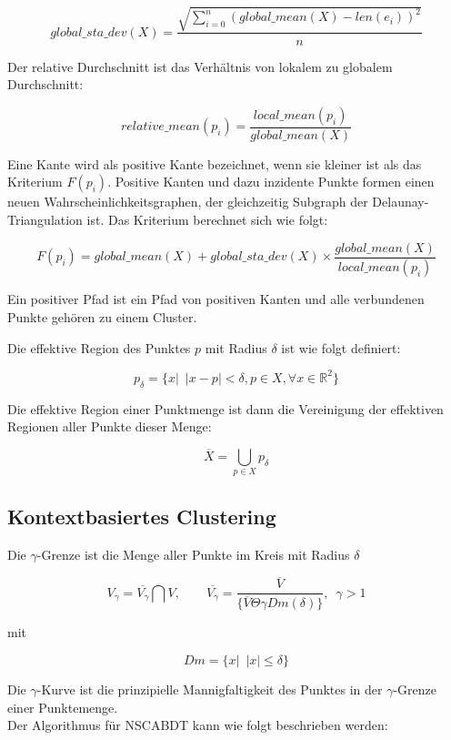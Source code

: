\documentclass[11pt,ceqn]{book}
\begin{document}
$$global\_sta\_dev(X)= \frac{\sqrt{\sum\limits_{i=0}^n \left(global\_mean(X)-len(e_i)\right)^2}}{n}$$

Der relative Durchschnitt ist das Verhältnis von lokalem zu globalem Durchschnitt:

$$relative\_mean(p_i) = \frac{local\_mean(p_i)}{global\_mean(X)}$$

Eine Kante wird als positive Kante bezeichnet, wenn sie kleiner ist als das Kriterium $F(p_i)$. Positive Kanten und dazu inzidente Punkte formen einen neuen Wahrscheinlichkeitsgraphen, der gleichzeitig Subgraph der Delaunay-Triangulation ist. Das Kriterium berechnet sich wie folgt:

$$F(p_i) = global\_mean(X) + global\_sta\_dev(X) \times \frac{global\_mean(X)}{local\_mean(p_i)}$$

Ein positiver Pfad ist ein Pfad von positiven Kanten und alle verbundenen Punkte gehören zu einem Cluster.

Die effektive Region des Punktes $p$ mit Radius $\delta$ ist wie folgt definiert:

$$p_{\delta} = \{x|\enspace|x-p|<\delta, p\in X,\forall x\in \mathbb{R}^2\}$$

Die effektive Region einer Punktmenge ist dann die Vereinigung der effektiven Regionen aller Punkte dieser Menge:

$$\overline{X} = \bigcup_{p\in X} p_{\delta}$$
\subsection{Kontextbasiertes Clustering}

Die $\gamma$-Grenze ist die Menge aller Punkte im Kreis mit Radius $\delta$

$$V_\gamma = \overline{V_{\gamma}} \bigcap V, \qquad \overline{V_{\gamma}} = 
\frac{\overline{V}}
{\{\overline{V} \Theta \gamma Dm(\delta)\}} 
, \enspace \gamma>1$$


mit 

$$Dm = \{x|\enspace |x|\leqslant \delta\}$$

Die $\gamma$-Kurve ist die prinzipielle Mannigfaltigkeit des Punktes in der $\gamma$-Grenze einer Punktemenge.\\

Der Algorithmus für NSCABDT kann wie folgt beschrieben werden:
\end{document}
